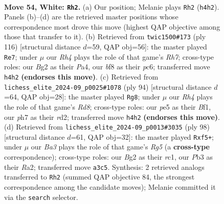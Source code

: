 \documentclass[11pt]{article}
\begin{document}
\clearpage

\begin{figure}[p]\centering
\begin{subfigure}{0.46\textwidth}\centering
\resizebox{\linewidth}{!}{%
\newchessgame
\chessboard[
  setfen={3r1b2/7p/p2pn3/P3p1kp/2P1P2R/BP3P2/3K2B1/8 w - - 4 54},
  showmover=false,
  pgfstyle=straightmove, color=movearrow, markmove={h4-h2}
]}
\caption{}
\end{subfigure}\hfill
\begin{subfigure}{0.46\textwidth}\centering
\resizebox{\linewidth}{!}{%
\newchessgame
\chessboard[
  setfen={4b3/7R/2p3kp/p2r1p2/Pp6/1P1B1KPP/2P5/8 w - - 14 59},
  showmover=false,
  pgfstyle=straightmove, color=movearrow, markmove={h7-e7}
]}
\caption{}
\end{subfigure}
\\[4pt]
\begin{subfigure}{0.46\textwidth}\centering
\resizebox{\linewidth}{!}{%
\newchessgame
\chessboard[
  setfen={3R4/2k5/3bp1p1/1p4Pp/1P3n1P/P1P2P2/3r1P2/5BK1 w - - 25 48},
  showmover=false,
  pgfstyle=straightmove, color=movearrow, markmove={d8-g8}
]}
\caption{}
\end{subfigure}\hfill
\begin{subfigure}{0.46\textwidth}\centering
\resizebox{\linewidth}{!}{%
\newchessgame
\chessboard[
  setfen={8/2r4p/pp2B2P/b2PkpR1/P3p3/4P2K/R4P2/2r5 w - - 2 50},
  showmover=false,
  pgfstyle=straightmove, color=movearrow, markmove={g5-f5}
]}
\caption{}
\end{subfigure}
\caption{\textbf{Move 54, White: \texttt{Rh2}.} (a) Our position; Melanie plays \texttt{Rh2} (\texttt{h4h2}). Panels (b)--(d) are the retrieved master positions whose correspondence most drove this move (highest QAP objective among those that transfer to it). (b) Retrieved from \texttt{twic1500\#173} (ply 116) [structural distance $d$=59, QAP obj=56]: the master played \texttt{Re7}; under $\mu$ our \emph{Rh4} plays the role of that game's \emph{Rh7}; cross-type roles: our \emph{B}g2 as their \emph{P}a4, our \emph{b}f8 as their \emph{p}c6; transferred move \texttt{h4h2} \textbf{(endorses this move)}. (c) Retrieved from \texttt{lichess\_elite\_2024-09\_p0025\#1078} (ply 94) [structural distance $d$=64, QAP obj=28]: the master played \texttt{Rg8}; under $\mu$ our \emph{Rh4} plays the role of that game's \emph{Rd8}; cross-type roles: our \emph{p}e5 as their \emph{B}f1, our \emph{p}h7 as their \emph{r}d2; transferred move \texttt{h4h2} \textbf{(endorses this move)}. (d) Retrieved from \texttt{lichess\_elite\_2024-09\_p0013\#3035} (ply 98) [structural distance $d$=61, QAP obj=32]: the master played \texttt{Rxf5+}; under $\mu$ our \emph{Ba3} plays the role of that game's \emph{Rg5} (a \textbf{cross-type} correspondence); cross-type roles: our \emph{B}g2 as their \emph{r}c1, our \emph{P}b3 as their \emph{R}a2; transferred move \texttt{a3c5}. Synthesis: 2 retrieved analogs transferred to \texttt{Rh2} (summed QAP objective 84, the strongest correspondence among the candidate moves); Melanie committed it via the \texttt{search} selector.}
\label{fig:thought-m106}
\end{figure}
\end{document}
